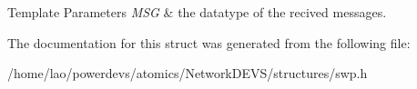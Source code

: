 \begin{DoxyTemplParams}{Template Parameters}
{\em M\+SG} & the datatype of the recived messages. \\
\hline
\end{DoxyTemplParams}


The documentation for this struct was generated from the following file\+:\begin{DoxyCompactItemize}
\item 
/home/lao/powerdevs/atomics/\+Network\+D\+E\+V\+S/structures/swp.\+h\end{DoxyCompactItemize}
